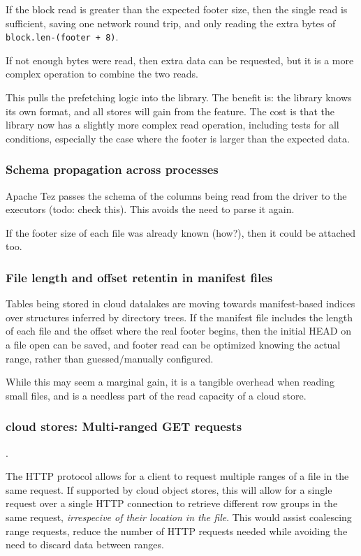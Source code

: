 \documentclass[manuscript]{acmart}
\begin{document}
If the block read is greater than the expected footer size, then the single read
is sufficient, saving one network round trip, and only reading the extra bytes of
\texttt{block.len-(footer + 8)}.

If not enough bytes were read, then extra data can be requested, but it is a more complex
operation to combine the two reads.

This pulls the prefetching logic into the library.
The benefit is: the library knows its own format, and all stores will gain from the feature.
The cost is that the library now has a slightly more complex read operation,
including tests for all conditions, especially the case where the footer is larger
than the expected data.

\subsubsection{Schema propagation across processes}

Apache Tez passes the schema of the columns being read from the driver to
the executors (todo: check this).
This avoids the need to parse it again.

If the footer size of each file was already known (how?), then it could be
attached too.


\subsubsection{File length and offset retentin in manifest files}

Tables being stored in cloud datalakes are moving towards manifest-based indices over structures inferred by directory trees.
If the manifest file includes the length of each file and the offset where the
real footer begins, then the initial HEAD on a file open can be saved,
and footer read can be optimized knowing the actual range, rather
than guessed/manually configured.

While this may seem a marginal gain, it is a tangible overhead when reading
small files, and is a needless part of the read capacity of a cloud store.



\subsubsection{cloud stores: Multi-ranged GET requests}.

The HTTP protocol allows for a client to request multiple ranges of a file
in the same request.
If supported by cloud object stores, this will allow for a single request
over a single HTTP connection to retrieve different row groups in the same
request, \emph{irrespecive of their location in the file}.
This would assist coalescing range requests, reduce the number of HTTP requests
needed while avoiding the need to discard data between ranges.
\end{document}
